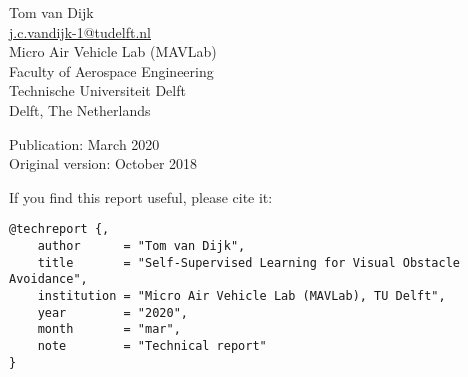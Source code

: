 
\thispagestyle{empty}

\hspace{1em}

\vfill

\noindent
Tom van Dijk\\
\url{j.c.vandijk-1@tudelft.nl}\\
Micro Air Vehicle Lab (MAVLab)\\
Faculty of Aerospace Engineering\\
Technische Universiteit Delft\\
Delft, The Netherlands

\bigskip

\noindent
Publication: March 2020\\
Original version: October 2018

\bigskip

\noindent
If you find this report useful, please cite it:
\begin{verbatim}
@techreport {,
    author      = "Tom van Dijk",
    title       = "Self-Supervised Learning for Visual Obstacle Avoidance",
    institution = "Micro Air Vehicle Lab (MAVLab), TU Delft",
    year        = "2020",
    month       = "mar",
    note        = "Technical report"
}
\end{verbatim}

\restoregeometry